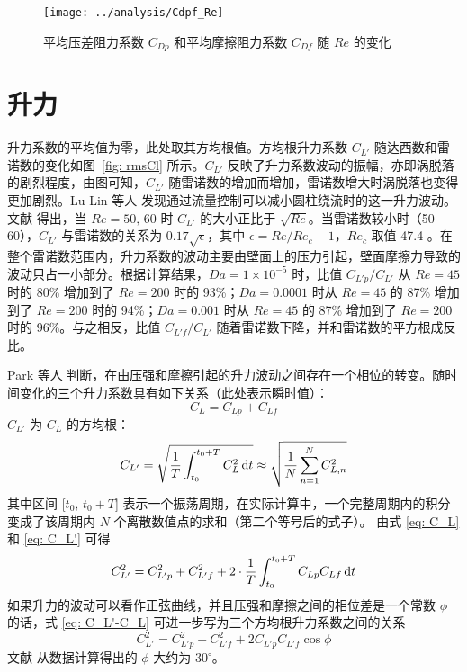 \begin{figure}
	\centering
	\texttt{[image: ../analysis/Cdpf\_Re]}
	\caption{平均压差阻力系数 $C_{Dp}$ 和平均摩擦阻力系数 $C_{Df}$ 随 $Re$ 的变化}
	\label{fig: meanCdpf}
\end{figure}

\section{升力}\label{sec: lift}

升力系数的平均值为零，此处取其方均根值。方均根升力系数 $C_{L'}$ 随达西数和雷诺数的变化如图~\ref{fig: rmsCl} 所示。$C_{L'}$ 反映了升力系数波动的振幅，亦即涡脱落的剧烈程度，由图可知，$C_{L'}$ 随雷诺数的增加而增加，雷诺数增大时涡脱落也变得更加剧烈。Lu Lin 等人 \cite{Lu2011} 发现通过流量控制可以减小圆柱绕流时的这一升力波动。文献  得出，当 $Re=50,\,60$ 时 $C_{L'}$ 的大小正比于 $\sqrt{Re}$。当雷诺数较小时（50--60），$C_{L'}$ 与雷诺数的关系为 $0.17\sqrt{\epsilon}$，其中 $\epsilon=Re/Re_c-1$，$Re_c$ 取值 47.4 \cite{Norberg1994,Kumar2006}。在整个雷诺数范围内，升力系数的波动主要由壁面上的压力引起，壁面摩擦力导致的波动只占一小部分。根据计算结果，$Da=1\times 10^{-5}$ 时，比值 $C_{L'p}/C_{L'}$ 从 $Re=45$ 时的 80\% 增加到了 $Re=200$ 时的 93\%；$Da=0.0001$ 时从 $Re=45$ 的 87\% 增加到了 $Re=200$ 时的 94\%；$Da=0.001$ 时从 $Re=45$ 的 87\% 增加到了 $Re=200$ 时的 96\%。与之相反，比值 $C_{L'f}/C_{L'}$ 随着雷诺数下降，并和雷诺数的平方根成反比。

Park 等人 \cite{Park1998} 判断，在由压强和摩擦引起的升力波动之间存在一个相位的转变。随时间变化的三个升力系数具有如下关系（此处表示瞬时值）：
\begin{equation}\label{eq: C_L}
	C_L = C_{Lp} + C_{Lf}
\end{equation}
$C_{L'}$ 为 $C_L$ 的方均根：
\begin{equation}\label{eq: C_L'}
	C_{L'} = \sqrt{\frac{1}{T}\int_{t_0}^{t_0+T}C_L^2\,\mathrm{d} t} \approx
	\sqrt{\frac{1}{N}\sum_{n=1}^N C_{L,n}^2}
\end{equation}
其中区间 [$t_0$, $t_0+T$] 表示一个振荡周期，在实际计算中，一个完整周期内的积分变成了该周期内 $N$ 个离散数值点的求和（第二个等号后的式子）。
由式 \eqref{eq: C_L} 和 \eqref{eq: C_L'} 可得
\begin{equation}\label{eq: C_L'-C_L}
	C_{L'}^2 = C_{L'p}^2 + C_{L'f}^2 + 2\cdot\frac{1}{T}\int_{t_0}^{t_0+T}C_{Lp}C_{Lf}\,\mathrm{d} t
\end{equation}
如果升力的波动可以看作正弦曲线，并且压强和摩擦之间的相位差是一个常数 $\phi$ 的话，式 \eqref{eq: C_L'-C_L} 可进一步写为三个方均根升力系数之间的关系
\begin{equation}
	C_{L'}^2 = C_{L'p}^2 + C_{L'f}^2 + 2C_{L'p}C_{L'f}\cos\phi
\end{equation}
文献  从数据计算得出的 $\phi$ 大约为 $30^\circ$。

